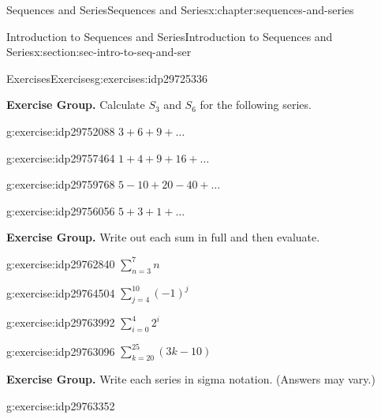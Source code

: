 \documentclass[twoside,10pt,]{book}
\numberwithin{equation}{section}
\begin{document}
\begin{chapterptx}{Sequences and Series}{}{Sequences and Series}{}{}{x:chapter:sequences-and-series}
\begin{sectionptx}{Introduction to Sequences and Series}{}{Introduction to Sequences and Series}{}{}{x:section:sec-intro-to-seq-and-ser}
\begin{exercises-subsection}{Exercises}{}{Exercises}{}{}{g:exercises:idp29725336}
\par\medskip\noindent
\par\medskip\noindent%
\textbf{Exercise Group.}\space\space%
Calculate \(S_3\) and \(S_6\) for the following series.\begin{exercisegroup}
\begin{divisionexerciseeg}{25}{}{}{g:exercise:idp29752088}%
\(3 + 6 + 9 + \ldots\)\end{divisionexerciseeg}%
\begin{divisionexerciseeg}{26}{}{}{g:exercise:idp29757464}%
\(1 + 4 + 9 + 16 + \ldots\)\end{divisionexerciseeg}%
\begin{divisionexerciseeg}{27}{}{}{g:exercise:idp29759768}%
\(5 -10 + 20 - 40 + \ldots\)\end{divisionexerciseeg}%
\begin{divisionexerciseeg}{28}{}{}{g:exercise:idp29756056}%
\(5 + 3 + 1 + \ldots\)\end{divisionexerciseeg}%
\end{exercisegroup}
\par\medskip\noindent
\par\medskip\noindent%
\textbf{Exercise Group.}\space\space%
Write out each sum in full and then evaluate.\begin{exercisegroup}
\begin{divisionexerciseeg}{29}{}{}{g:exercise:idp29762840}%
\(\sum\limits_{n = 3}^7 n \)\end{divisionexerciseeg}%
\begin{divisionexerciseeg}{30}{}{}{g:exercise:idp29764504}%
\(\sum\limits_{j = 4}^{10} {{{\left( { - 1} \right)}^j}}\)\end{divisionexerciseeg}%
\begin{divisionexerciseeg}{31}{}{}{g:exercise:idp29763992}%
\(\sum\limits_{i = 0}^4 {{2^i}}\)\end{divisionexerciseeg}%
\begin{divisionexerciseeg}{32}{}{}{g:exercise:idp29763096}%
\(\sum\limits_{k = 20}^{25} {\left( {3k - 10} \right)}\)\end{divisionexerciseeg}%
\end{exercisegroup}
\par\medskip\noindent
\par\medskip\noindent%
\textbf{Exercise Group.}\space\space%
Write each series in sigma notation.  (Answers may vary.)\begin{exercisegroup}
\begin{divisionexerciseeg}{33}{}{}{g:exercise:idp29763352}%

\end{divisionexerciseeg}
\end{exercisegroup}
\end{exercises-subsection}
\end{sectionptx}
\end{chapterptx}
\end{document}
